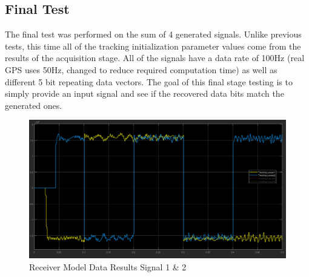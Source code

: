 \documentclass[11pt]{article}
\numberwithin{equation}{subsection}
\begin{document}
	\subsection{Final Test}
	The final test was performed on the sum of 4 generated signals. Unlike previous tests, this time all of the tracking initialization parameter values come from the results of the acquisition stage. All of the signals have a data rate of 100Hz (real GPS uses 50Hz, changed to reduce required computation time) as well as different 5 bit repeating data vectors. The goal of this final stage testing is to simply provide an input signal and see if the recovered data bits match the generated ones. 
	
	\begin{figure}
		\centering
		\includegraphics[width=\textwidth]{Synth_Test_Data_1}
		\caption{Receiver Model Data Results Signal 1 \& 2}
		\label{RD1}
	\end{figure}	
	
\end{document}
